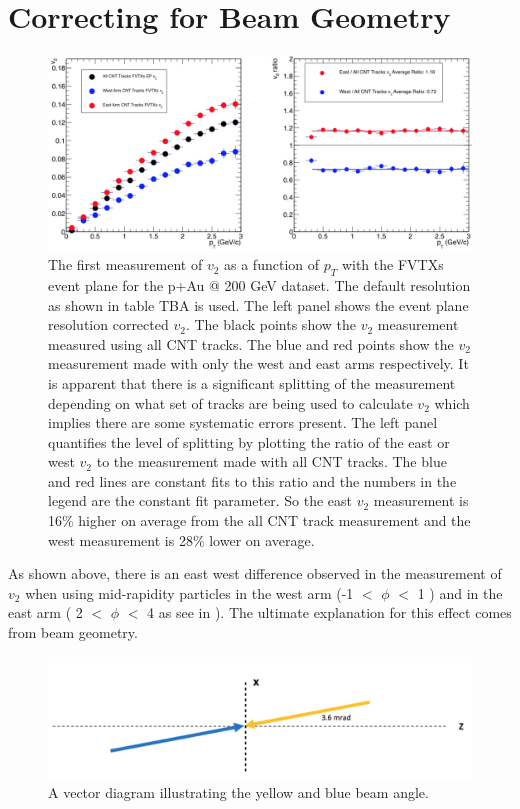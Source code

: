 \section{Correcting for Beam Geometry}
\begin{figure}[!h]
\begin{center}
\includegraphics[width=0.95\linewidth]{figs/fvtxs_default_ew.png}
\caption{The first measurement of $v_{2}$ as a function of $p_T$ with the FVTXs event plane for the p+Au @ 200 GeV dataset. The default resolution as shown in table TBA is used. The left panel shows the event plane resolution corrected $v_2$. The black points show the $v_2$ measurement measured using all CNT tracks. The blue and red points show the $v_2$ measurement made with only the west and east arms respectively. It is apparent that there is a significant splitting of the measurement depending on what set of tracks are being used to calculate $v_2$ which implies there are some systematic errors present. The left panel quantifies the level of splitting by plotting the ratio of the east or west $v_2$ to the measurement made with all CNT tracks. The blue and red lines are constant fits to this ratio and the numbers in the legend are the constant fit parameter. So the east $v_2$ measurement is 16$\%$ higher on average from the all CNT track measurement and the west measurement is 28$\%$ lower on average.}
\end{center}
\end{figure}
As shown above, there is an east west difference observed in the measurement of $v_2$ when using mid-rapidity particles in the west arm (-1 $<$ $\phi$ $<$ 1 ) and in the east arm ( 2 $<$ $\phi$ $<$ 4 as see in ). The ultimate explanation for this effect comes from beam geometry. 

\begin{figure}[h!]
\begin{center}
\includegraphics[width=0.55\linewidth]{figs/beam_angle.png}
\caption{A vector diagram illustrating the yellow and blue beam angle.}
\label{fig:diagram2}
\end{center}
\end{figure}

